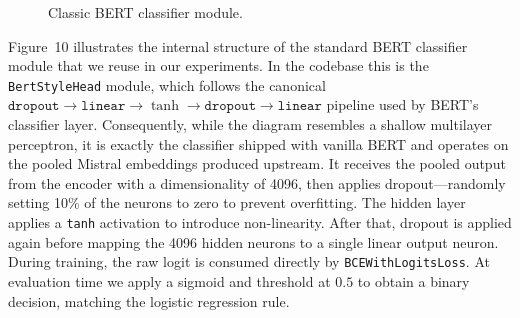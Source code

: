 \documentclass[12pt]{article}
\begin{document}
\begin{figure}[htbp]
\begin{adjustwidth}{-0.3cm}{0cm}
\begin{minipage}{1\textwidth}
\end{minipage}
\end{adjustwidth}
\caption{Classic BERT classifier module.}
\label{fig:bert-classifier-module}
\end{figure}

Figure~10 illustrates the internal structure of the standard BERT classifier module that we reuse in our experiments. 
In the codebase this is the \texttt{BertStyleHead} module, which follows the canonical $\texttt{dropout} \rightarrow \texttt{linear} \rightarrow \tanh \rightarrow \texttt{dropout} \rightarrow \texttt{linear}$ pipeline used by BERT's classifier layer. 
Consequently, while the diagram resembles a shallow multilayer perceptron, it is exactly the classifier shipped with vanilla BERT and operates on the pooled Mistral embeddings produced upstream.
It receives the pooled output from the encoder with a dimensionality of 4096, then applies dropout\;---\;randomly setting 10\% of the neurons to zero to prevent overfitting. 
The hidden layer applies a \texttt{tanh} activation to introduce non-linearity. 
After that, dropout is applied again before mapping the 4096 hidden neurons to a single linear output neuron. 
During training, the raw logit is consumed directly by \texttt{BCEWithLogitsLoss}. 
At evaluation time we apply a sigmoid and threshold at $0.5$ to obtain a binary decision, matching the logistic regression rule.
\end{document}
